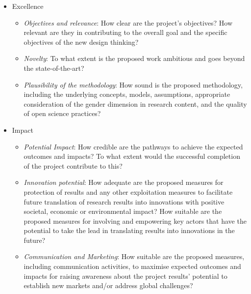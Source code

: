 \documentclass{ammTalk}
\begin{document}
\begin{itemize}[itemsep=5mm]\LARGE
 \item Excellence %
       \begin{itemize}[itemsep=5mm]\Large
        \item \emph{Objectives and relevance}: How clear are the project's objectives? How relevant are they in contributing to the overall goal and the specific objectives of the new design thinking?
        \item \emph{Novelty}: To what extent is the proposed work ambitious and goes beyond the state-of-the-art?
        \item \emph{Plausibility of the methodology}: How sound is the proposed methodology, including the underlying concepts, models, assumptions, appropriate consideration of the gender dimension in research content, and the quality of open science practices?
       \end{itemize}
 \item Impact %
       \begin{itemize}[itemsep=5mm]\Large
        \item \emph{Potential Impact}: How credible are the pathways to achieve the expected outcomes and impacts? To what extent would the successful completion of the project contribute to this?
        \item \emph{Innovation potential}: How adequate are the proposed measures for protection of results and any other exploitation measures to facilitate future translation of research results into innovations with positive societal, economic or environmental impact? How suitable are the proposed measures for involving and empowering key actors that have the potential to take the lead in translating results into innovations in the future?
        \item \emph{Communication and Marketing}: How suitable are the proposed measures, including communication activities, to maximise expected outcomes and impacts for raising awareness about the project results' potential to establish new markets and/or address global challenges?
       \end{itemize}
\end{itemize}
\end{document}
